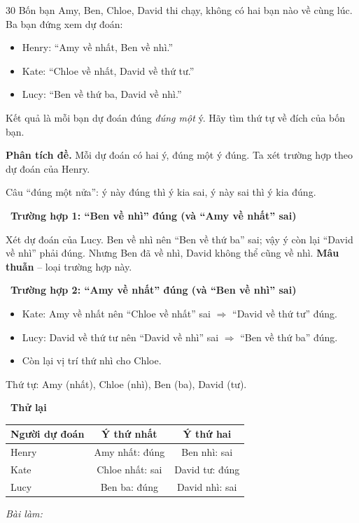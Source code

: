 \documentclass[11pt]{article}
\newif\ifsol \solfalse
\newenvironment{probbox}[2]{\begin{probboxT}{#1}{#2}}{\end{probboxT}}
\newcommand{\StuProb}[2]{\begin{probboxS}{#1}{#2}\StuProbBody\end{probboxS}}
\newcommand{\probsol}[1]{%
  \begin{lrbox}{\solmeasure}\begin{minipage}{\dimexpr\linewidth-24pt\relax}#1\end{minipage}\end{lrbox}%
  \ifsol
    \begin{solbox}#1\end{solbox}%
  \else
    \setlength{\solht}{\dimexpr\ht\solmeasure+\dp\solmeasure+0.85cm\relax}%
    \ifdim\solht<1.35cm\setlength{\solht}{1.35cm}\fi
    \ifdim\solht>\StudentMaxWork\setlength{\solht}{\StudentMaxWork}\fi
    \par\noindent\begin{minipage}{\linewidth}%
    \expandafter\StuProb\StuProbArgs
    \begin{tcolorbox}[colback=white,colframe=Line,boxrule=0.8pt,arc=5pt,
      left=8pt,right=8pt,top=4pt,bottom=4pt,height=\solht]{\footnotesize\color{Slate}\itshape\WorkWord}\end{tcolorbox}%
    \end{minipage}\par\medskip
  \fi}
\newlength{\StudentMaxWork}\setlength{\StudentMaxWork}{4.5cm}
\newcommand{\step}[2]{\par\smallskip\noindent{\bfseries\color{tmBlue!85!black}\StepWord~#1.}\ {\bfseries #2}\par\nopagebreak}
\def\WorkWord{Bài làm:}
\def\StepWord{Bước}
\begin{document}
\begin{probbox}{30}{\relax}
Bốn bạn Amy, Ben, Chloe, David thi chạy, không có hai bạn nào về cùng lúc. Ba bạn đứng xem dự đoán:
\begin{itemize}[leftmargin=1.6em,itemsep=0pt,topsep=2pt]
\item Henry: ``Amy về nhất, Ben về nhì.''
\item Kate: ``Chloe về nhất, David về thứ tư.''
\item Lucy: ``Ben về thứ ba, David về nhì.''
\end{itemize}
Kết quả là mỗi bạn dự đoán đúng \emph{đúng một} ý. Hãy tìm thứ tự về đích của bốn bạn.
\end{probbox}
\probsol{
\textbf{Phân tích đề.} Mỗi dự đoán có hai ý, đúng một ý đúng. Ta xét trường hợp theo dự đoán của Henry.
\begin{recallbox}Câu ``đúng một nửa'': ý này đúng thì ý kia sai, ý này sai thì ý kia đúng.\end{recallbox}
\step{1}{Trường hợp 1: ``Ben về nhì'' đúng (và ``Amy về nhất'' sai)}
Xét dự đoán của Lucy. Ben về nhì nên ``Ben về thứ ba'' sai; vậy ý còn lại ``David về nhì'' phải đúng. Nhưng Ben đã về nhì, David không thể
cũng về nhì. \textbf{Mâu thuẫn} -- loại trường hợp này.
\step{2}{Trường hợp 2: ``Amy về nhất'' đúng (và ``Ben về nhì'' sai)}
\begin{itemize}[leftmargin=1.4em,itemsep=1pt,topsep=1pt]
\item Kate: Amy về nhất nên ``Chloe về nhất'' sai $\Rightarrow$ ``David về thứ tư'' đúng.
\item Lucy: David về thứ tư nên ``David về nhì'' sai $\Rightarrow$ ``Ben về thứ ba'' đúng.
\item Còn lại vị trí thứ nhì cho Chloe.
\end{itemize}
Thứ tự: Amy (nhất), Chloe (nhì), Ben (ba), David (tư).
\step{3}{Thử lại}
\begin{center}
\begin{tabular}{|l|c|c|}
\hline
\rowcolor{tmBlue!10} Người dự đoán & Ý thứ nhất & Ý thứ hai \\ \hline
Henry & Amy nhất: \textcolor{tmGreen!70!black}{đúng} & Ben nhì: \textcolor{AnsRed}{sai} \\ \hline
Kate & Chloe nhất: \textcolor{AnsRed}{sai} & David tư: \textcolor{tmGreen!70!black}{đúng} \\ \hline
Lucy & Ben ba: \textcolor{tmGreen!70!black}{đúng} & David nhì: \textcolor{AnsRed}{sai} \\ \hline

\end{tabular}
\end{center}}
\end{document}
